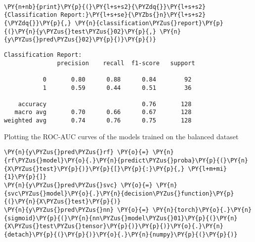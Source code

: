     \begin{center}
    \end{center}
    { \hspace*{\fill} \\}
    
    \begin{tcolorbox}[breakable, size=fbox, boxrule=1pt, pad at break*=1mm,colback=cellbackground, colframe=cellborder]
\begin{Verbatim}[commandchars=\\\{\}]
\PY{n+nb}{print}\PY{p}{(}\PY{l+s+s2}{\PYZdq{}}\PY{l+s+s2}{Classification Report:}\PY{l+s+se}{\PYZbs{}n}\PY{l+s+s2}{\PYZdq{}}\PY{p}{,} \PY{n}{classification\PYZus{}report}\PY{p}{(}\PY{n}{y\PYZus{}test\PYZus{}02}\PY{p}{,} \PY{n}{y\PYZus{}pred\PYZus{}02}\PY{p}{)}\PY{p}{)}
\end{Verbatim}
\end{tcolorbox}

    \begin{Verbatim}[commandchars=\\\{\}]
Classification Report:
               precision    recall  f1-score   support

           0       0.80      0.88      0.84        92
           1       0.59      0.44      0.51        36

    accuracy                           0.76       128
   macro avg       0.70      0.66      0.67       128
weighted avg       0.74      0.76      0.75       128

    \end{Verbatim}

    Plotting the ROC-AUC curves of the models trained on the balanced
dataset

    \begin{tcolorbox}[breakable, size=fbox, boxrule=1pt, pad at break*=1mm,colback=cellbackground, colframe=cellborder]
\begin{Verbatim}[commandchars=\\\{\}]
\PY{n}{y\PYZus{}pred\PYZus{}rf} \PY{o}{=} \PY{n}{rf\PYZus{}model}\PY{o}{.}\PY{n}{predict\PYZus{}proba}\PY{p}{(}\PY{n}{X\PYZus{}test}\PY{p}{)}\PY{p}{[}\PY{p}{:}\PY{p}{,} \PY{l+m+mi}{1}\PY{p}{]}
\PY{n}{y\PYZus{}pred\PYZus{}svc} \PY{o}{=} \PY{n}{svc\PYZus{}model}\PY{o}{.}\PY{n}{decision\PYZus{}function}\PY{p}{(}\PY{n}{X\PYZus{}test}\PY{p}{)}
\PY{n}{y\PYZus{}pred\PYZus{}nn} \PY{o}{=} \PY{n}{torch}\PY{o}{.}\PY{n}{sigmoid}\PY{p}{(}\PY{n}{nn\PYZus{}model\PYZus{}01}\PY{p}{(}\PY{n}{X\PYZus{}test\PYZus{}tensor}\PY{p}{)}\PY{p}{)}\PY{o}{.}\PY{n}{detach}\PY{p}{(}\PY{p}{)}\PY{o}{.}\PY{n}{numpy}\PY{p}{(}\PY{p}{)}
\end{Verbatim}
\end{tcolorbox}

